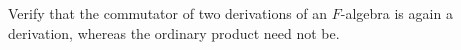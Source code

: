 Verify that the commutator of two derivations of an $F$-algebra is again a derivation, whereas the ordinary product need not be.
